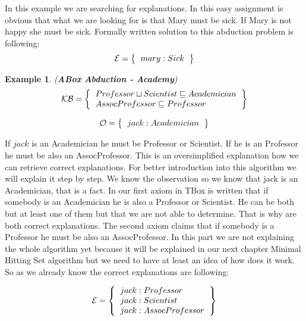 \documentclass[12pt,a4paper]{article}
\newtheorem{example}{Example}[subsection]
\begin{document}
In this example we are searching for explanations. In this easy assignment is obvious that what we are looking for is that Mary must be sick. If Mary is not happy she must be sick. Formally written solution to this abduction problem is following:
\[ 
\mathcal{E} = \left\{
\begin{tabular}{l c}
$mary : Sick$
\end{tabular}
\right \}
\]

\begin{example}{(\textbf{ABox Abduction - Academy})}
	\[ 
	\mathcal{KB} = \left\{
	\begin{tabular}{l c}
		$Professor \sqcup Scientist \sqsubseteq Academician$ \\
		$AssocProfessor \sqsubseteq Professor$ \\
	\end{tabular}
	\right \}
	\]
	
	\[ 
	\mathcal{O} = \left\{
	\begin{tabular}{l c}
		$jack : Academician$
	\end{tabular}
	\right \}
	\]								
	
\end{example}

If $jack$ is an Academician he must be Professor or Scientist. If he is an Professor he must be also an AssocProfessor. This is an oversimplified explanation how we can retrieve correct explanations. For better introduction into this algorithm we will explain it step by step. We know the observation so we know that jack is an Academician, that is a fact. In our first axiom in TBox is written that if somebody is an Academician he is also a Professor or Scientist. He can be both but at least one of them but that we are not able to determine. That is why are both correct explanations. The second axiom claims that if somebody is a Professor he must be also an AssocProfessor. In this part we are not explaining the whole algorithm yet because it will be explained in our next chapter Minimal Hitting Set algorithm but we need to have at least an idea of how does it work. So as we already know the correct explanations are following:

\[ 
\mathcal{E} = \left\{
\begin{tabular}{l c}
	$jack : Professor$ \\
	$jack : Scientist$ \\
	$jack : AssocProfessor$ \\
\end{tabular}
\right \}
\]
\end{document}
